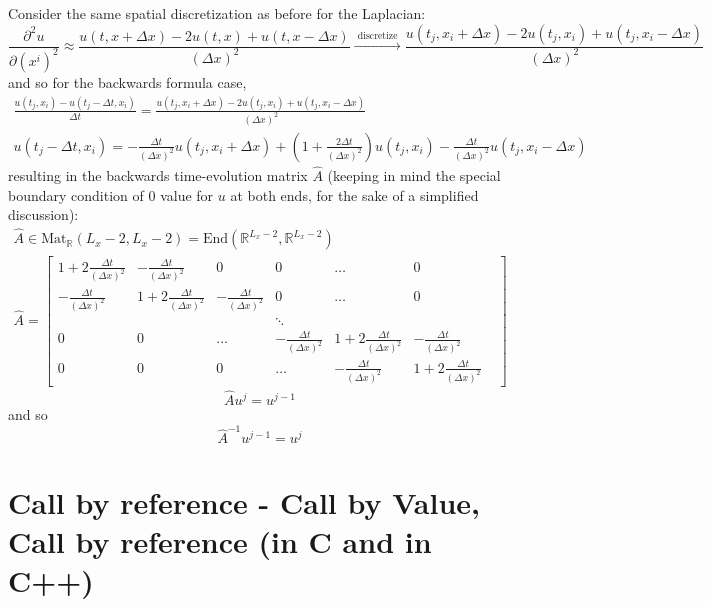 \documentclass[10pt]{amsart}
\begin{document}
\begin{multicols*}{2}
Consider the same spatial discretization as before for the Laplacian:
\[
\frac{ \partial^2 u}{ \partial (x^i)^2 } \approx \frac{ u(t,x + \Delta x) - 2 u(t,x) + u(t, x-\Delta x) }{ (\Delta x)^2 }  \xrightarrow{ \text{ discretize } } \frac{ u(t_j  , x_i+\Delta x) - 2 u(t_j,x_i) + u(t_j,x_i-\Delta x) }{ ( \Delta x)^2 } 
\]
and so for the backwards formula case, 
\begin{equation}
  \begin{gathered}
 \frac{ u(t_j,x_i) - u(t_j-\Delta t, x_i) }{ \Delta t}   =  \frac{ u(t_j  , x_i+\Delta x) - 2 u(t_j,x_i) + u(t_j,x_i-\Delta x) }{ ( \Delta x)^2 }  \\
 u(t_j - \Delta t, x_i) = -\frac{ \Delta t}{ (\Delta x)^2 } u(t_j,x_i + \Delta x) + \left( 1 + \frac{ 2 \Delta t}{ (\Delta x)^2 } \right) u (t_j,x_i) - \frac{ \Delta t}{ (\Delta x)^2 } u(t_j,x_i - \Delta x)
    \end{gathered}
 \end{equation}
resulting in the backwards time-evolution matrix $\widehat{A}$ (keeping in mind the special boundary condition of $0$ value for $u$ at both ends, for the sake of a simplified discussion):
\begin{equation}
  \begin{gathered}
    \widehat{A} \in \text{Mat}_{\mathbb{R}}(L_x-2,L_x-2) = \text{End}(\mathbb{R}^{L_x-2}, \mathbb{R}^{L_x-2}) \\
    \widehat{A} = \left[ \begin{matrix}
        1 + 2  \frac{ \Delta t}{ (\Delta x)^2 } &  -\frac{ \Delta t}{ (\Delta x)^2 } & 0 & 0 & \dots  &  0  \\
         -\frac{ \Delta t}{ (\Delta x)^2 } & 1 +  2 \frac{ \Delta t}{ (\Delta x)^2 } &  -\frac{ \Delta t}{ (\Delta x)^2 } & 0 &  \dots & 0  \\ 
                 &  &  & \ddots  &   &   & \\
         0   & 0  & \dots  &   -\frac{ \Delta t}{ (\Delta x)^2 } & 1 + 2  \frac{ \Delta t}{ (\Delta x)^2 } & - \frac{ \Delta t}{ (\Delta x)^2 }  \\
         0 & 0 & 0 & \dots &  - \frac{ \Delta t}{ (\Delta x)^2 } & 1 + 2  \frac{ \Delta t}{ (\Delta x)^2 } 
        \end{matrix} \right]
  \end{gathered}
\end{equation}  
\[
\widehat{A}u^j = u^{j-1}
\]
and so
\[
\widehat{A}^{-1}u^{j-1} = u^j
\]



\section{Call by reference - Call by Value, Call by reference (in C and in C++)}


\end{multicols*}
\end{document}
